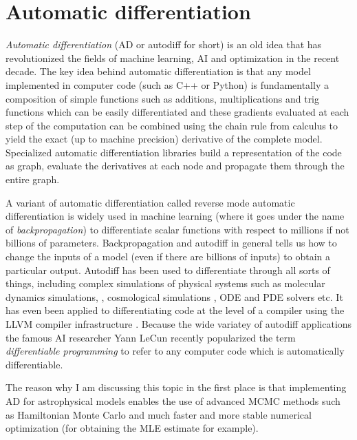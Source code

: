 \documentclass[12pt,dvipsnames]{report}
\begin{document}
\section{Automatic differentiation}
\label{sec:autodiff}
\textsl{Automatic differentiation} (AD or autodiff for short)\citep{10.1145/355586.364791} is an old idea 
that has revolutionized the fields of machine learning, AI and optimization in the 
recent decade. 
The key idea behind automatic differentiation 
is that any model implemented in computer code (such as \textsf{C++} or 
\textsf{Python}) is fundamentally a composition 
of simple functions such as additions, multiplications and trig functions 
which can be easily differentiated and these gradients evaluated at each step 
of the computation can be combined using the chain rule from calculus to 
yield the exact (up to machine precision) derivative of the complete model.
Specialized automatic differentiation libraries build a representation of the 
code as graph, evaluate the derivatives at each node and propagate them through 
the entire graph. 

A variant of automatic differentiation called reverse mode automatic differentiation 
is widely used in machine learning (where it goes under the name of 
\emph{backpropagation}) to differentiate scalar functions with respect to 
millions if not billions of parameters. 
Backpropagation and autodiff in general tells us how to change the inputs of a 
model (even if there are billions of inputs) to obtain a particular output.
Autodiff has been used to differentiate through all sorts of things, including 
complex simulations of physical systems such as molecular dynamics simulations,
\citep{arXiv:1912.04232}, cosmological simulations \citep{2016MNRAS.463.2273F},
 ODE and PDE solvers etc. It has even been applied to differentiating code at 
 the level of a compiler using the LLVM compiler infrastructure \citep{arXiv:2010.01709}.
 Because the wide variatey of autodiff applications
the famous AI researcher Yann LeCun recently popularized the term 
\textsl{differentiable programming} to refer to any computer code which is 
automatically differentiable.

The reason why I am discussing this topic in the first place is that implementing AD 
for astrophysical models enables the use  of advanced MCMC methods such as 
Hamiltonian Monte Carlo and much faster and more stable numerical optimization  
(for obtaining the MLE estimate for example).
\end{document}
